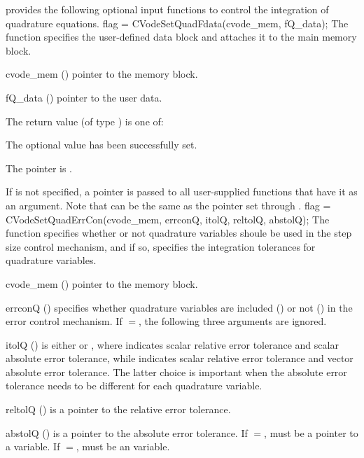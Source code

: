 {\cvodes} provides the following optional input functions to control the integration
of quadrature equations.
{
  flag = CVodeSetQuadFdata(cvode\_mem, fQ\_data);
}
{
  The function  specifies the user-defined data block 
  and attaches it to the main {\cvodes} memory block.
}
{
  \begin{args}
  \item[cvode\_mem] ()
    pointer to the {\cvodes} memory block.
  \item[fQ\_data] ()
    pointer to the user data.
  \end{args}
}
{
  The return value  (of type ) is one of:
  \begin{args}
  \item[\Id{CV\_SUCCESS}] 
    The optional value has been successfully set.
  \item[\Id{CV\_MEM\_NULL}]
    The  pointer is .
  \end{args}
}
{
  If  is not specified, a  pointer is
  passed to all user-supplied functions that have it as an argument.
  Note that  can be the same as the
  pointer  set through .
}
{
  flag = CVodeSetQuadErrCon(cvode\_mem, errconQ, itolQ, reltolQ, abstolQ);
}
{
  The function  specifies whether or not quadrature variables
  shoule be used in the step size control mechanism, and if so, specifies the integration 
  tolerances for quadrature variables.
}
{
  \begin{args}
  \item[cvode\_mem] ()
    pointer to the {\cvodes} memory block.
  \item[errconQ] ()
    specifies whether quadrature variables are included () or not
    () in the error control mechanism. If $=$,
    the following three arguments are ignored.
  \item[itolQ] () 
    is either  or , where  indicates 
    scalar relative error tolerance and scalar absolute error tolerance, 
    while  indicates scalar relative error tolerance and 
    vector absolute error tolerance. 
    The latter choice is important when the absolute error tolerance needs to
    be different for each quadrature variable.
  \item[reltolQ] ()
    is a pointer to the relative error tolerance.
  \item[abstolQ] ()
    is a pointer to the absolute error tolerance.  If $=$, 
    must be a pointer to a  variable. If $=$, 
    must be an  variable.
  \item
  \end{args}
}
